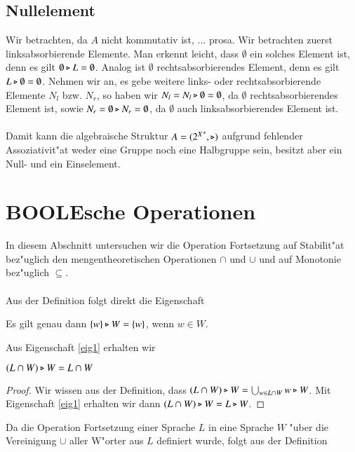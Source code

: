 \subsection{Nullelement}
Wir betrachten, da $A$ nicht kommutativ ist, ... prosa.
Wir betrachten zuerst linksabsorbierende Elemente.
Man erkennt leicht, dass $\emptyset$ ein solches Element ist, denn es gilt $\emptyset\triangleright L = \emptyset$.
Analog ist $\emptyset$ rechtsabsorbierendes Element, denn es gilt $L\triangleright\emptyset =\emptyset$.
Nehmen wir an, es gebe weitere links- oder rechtsabsorbierende Elemente $N_l$ bzw. $N_r$, so haben wir $N_l = N_l\triangleright \emptyset = \emptyset$, da $\emptyset$ rechtsabsorbierendes Element ist, sowie $N_r = \emptyset\triangleright N_r = \emptyset$, da $\emptyset$ auch linksabsorbierendes Element ist.\\\\
Damit kann die algebraische Struktur $A=({2^X}^*,\triangleright)$ aufgrund fehlender Assoziativit"at weder eine Gruppe noch eine Halbgruppe sein, besitzt aber ein Null- und ein Einselement.

\section{BOOLEsche Operationen}
In diesem Abschnitt untersuchen wir die Operation Fortsetzung auf Stabilit"at bez"uglich den mengentheoretischen Operationen $\cap$ und $\cup$ und auf Monotonie bez"uglich $\subseteq$.
\\\\Aus der Definition folgt direkt die Eigenschaft

\vspace{2ex}

\begin{eigen}\label{eig1}
Es gilt genau dann $\{w\} \triangleright W = \{w\}$, wenn $w\in W$.
\end{eigen}

Aus Eigenschaft \ref{eig1} erhalten wir

\vspace{2ex}

\begin{eigen}
$(L\cap W) \triangleright W = L\cap W$
\end{eigen}
\begin{proof}
Wir wissen aus der Definition, dass $(L\cap W)\triangleright W = \bigcup_{w\in L\cap W} w\triangleright W$. Mit Eigenschaft \ref{eig1} erhalten wir dann $(L\cap W)\triangleright W = L\triangleright W$.
\end{proof}

Da die Operation Fortsetzung einer Sprache $L$ in eine Sprache $W$ "uber die Vereinigung $\cup$ aller W"orter aus $L$ definiert wurde, folgt aus der Definition

